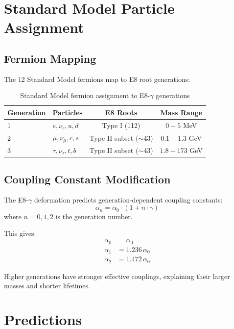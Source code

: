 \documentclass[12pt,a4paper]{article}
\begin{document}
\section{Standard Model Particle Assignment}

\subsection{Fermion Mapping}

The 12 Standard Model fermions map to E8 root generations:

\begin{table}[h]
\centering
\begin{tabular}{llcc}
\toprule
Generation & Particles & E8 Roots & Mass Range \\
\midrule
1 & $e, \nu_e, u, d$ & Type I (112) & $0 - 5$ MeV \\
2 & $\mu, \nu_\mu, c, s$ & Type II subset ($\sim$43) & $0.1 - 1.3$ GeV \\
3 & $\tau, \nu_\tau, t, b$ & Type II subset ($\sim$43) & $1.8 - 173$ GeV \\
\bottomrule
\end{tabular}
\caption{Standard Model fermion assignment to E8-$\gamma$ generations}
\end{table}

\subsection{Coupling Constant Modification}

The E8-$\gamma$ deformation predicts generation-dependent coupling constants:
\begin{equation}
\alpha_n = \alpha_0 \cdot (1 + n \cdot \gamma)
\end{equation}
where $n = 0, 1, 2$ is the generation number.

This gives:
\begin{align}
\alpha_0 &= \alpha_0 \\
\alpha_1 &= 1.236\,\alpha_0 \\
\alpha_2 &= 1.472\,\alpha_0
\end{align}

Higher generations have stronger effective couplings, explaining their larger masses and shorter lifetimes.

\section{Predictions}
\end{document}
